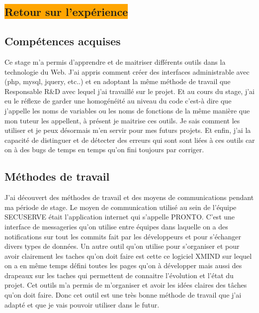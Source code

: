 \begin{center}
\section{\colorbox{orange}{Retour sur l'expérience}}
\end{center}

\subsection{Compétences acquises}
Ce stage m'a permis d'apprendre et de maitriser différents outils dans la technologie du Web. J'ai appris comment créer des interfaces administrable avec (php, mysql, jquery, etc..) et en adoptant la même méthode de travail que Responsable R\&D avec lequel j'ai travaillé sur le projet. Et au cours du stage, j'ai eu le réflexe de garder une homogénéité au niveau du code c'est-à dire que j'appelle les noms de variables ou les noms de fonctions de la même manière que mon tuteur les appellent, à présent je maitrise ces outils. Je sais comment les utiliser et je peux désormais m'en servir pour mes futurs projets. Et enfin, j'ai la capacité de distinguer et de détecter des erreurs qui sont sont liées à ces outils car on à des bugs de temps en temps qu'on fini toujours par corriger. 
\subsection{Méthodes de travail}
J'ai découvert des méthodes de travail et des moyens de communications pendant ma période de stage. Le moyen de communication utilisé au sein de l'équipe SECUSERVE  était l'application internet qui s'appelle PRONTO. C'est une interface de messageries qu'on utilise entre équipes dans laquelle on a des notifications sur tout les commits fait par les développeurs et pour s'échanger divers types de données.
Un autre outil qu'on utilise pour s'organiser et pour avoir clairement les taches qu'on doit faire est cette ce logiciel XMIND sur lequel on a en même temps défini toutes les pages qu'on à développer mais aussi des drapeaux sur les taches qui permettent de connaitre l'évolution et l'état du projet. Cet outils m'a permis de m'organiser et avoir les idées claires des tâches qu'on doit faire. Donc cet outil est une très bonne méthode de travail que j'ai adapté et que je vais pouvoir utiliser dans le futur.  


